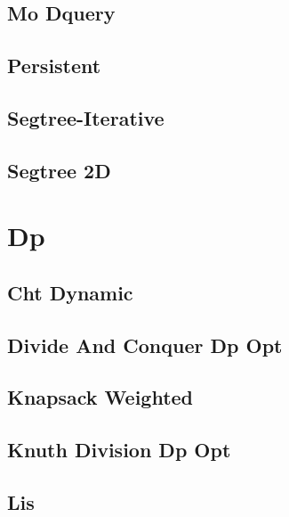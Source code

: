 \documentclass[9pt,portrait,twocolumn,a4paper,notitlepage]{article}
\newcommand\cppfile[2][]{%
\ifstrempty{#1}{}{}%
}
\begin{document}
\subsection{Mo Dquery}
\cppfile{data_structures_clean/Mo_DQuery.cpp}

\subsection{Persistent}
\cppfile{data_structures_clean/persistent.cpp}

\subsection{Segtree-Iterative}
\cppfile{data_structures_clean/segtree-iterative.cpp}

\subsection{Segtree 2D}
\cppfile{data_structures_clean/segtree_2d.cpp}


\section{Dp}

\subsection{Cht Dynamic}
\cppfile{dp_clean/CHT_Dynamic.cpp}

\subsection{Divide And Conquer Dp Opt}
\cppfile{dp_clean/divide_and_conquer_dp_opt.cpp}

\subsection{Knapsack Weighted}
\cppfile{dp_clean/Knapsack_weighted.cpp}

\subsection{Knuth Division Dp Opt}
\cppfile{dp_clean/knuth_division_dp_opt.cpp}

\subsection{Lis}
\cppfile{dp_clean/LIS.cpp}
\end{document}
